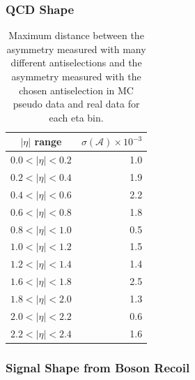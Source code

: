 \subsubsection{QCD \ETm Shape}


\begin{table}[htbp]
\begin{center}
\begin{tabular}{cr}
$|\eta|$ range  & $\sigma(\mathcal{A}) \times 10^{-3}$\\
\hline
$0.0<|\eta|<0.2$ & 1.0\\
$0.2<|\eta|<0.4$ & 1.9\\
$0.4<|\eta|<0.6$ & 2.2\\
$0.6<|\eta|<0.8$ & 1.8\\
$0.8<|\eta|<1.0$ & 0.5\\
$1.0<|\eta|<1.2$ & 1.5\\
$1.2<|\eta|<1.4$ & 1.4\\
$1.6<|\eta|<1.8$ & 2.5\\
$1.8<|\eta|<2.0$ & 1.3\\
$2.0<|\eta|<2.2$ & 0.6\\
$2.2<|\eta|<2.4$ & 1.6\\
\end{tabular}
\caption{Maximum distance between the asymmetry measured with many different antiselections
and the asymmetry measured with the chosen antiselection in MC pseudo data and real data for each eta bin.}
\label{tab:systQCD}
\end{center}
\end{table}

\subsubsection{Signal \ETm Shape from Boson Recoil}

